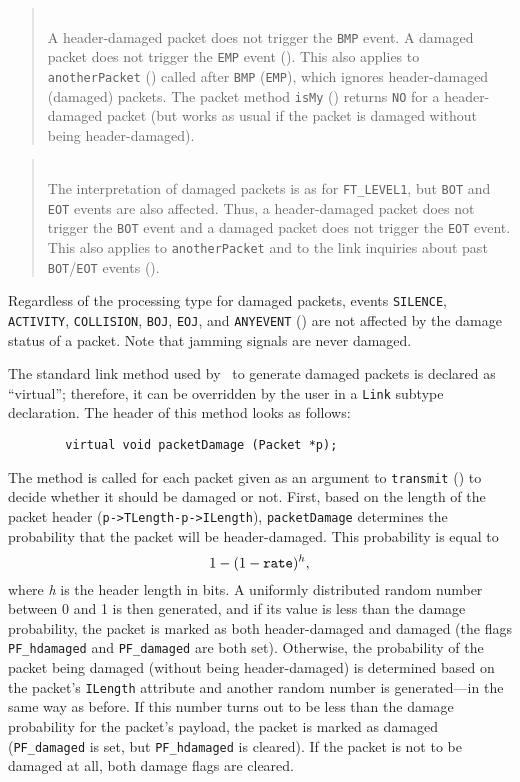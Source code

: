 \begin{quote}
\noindent{}\\ \hspace{0in}
A header-damaged packet does not trigger the {\tt BMP} event.
A damaged packet does not trigger the {\tt EMP} event ().
This also applies to {\tt anotherPacket} ()
called after {\tt BMP} ({\tt EMP}),
which ignores header-damaged (damaged) packets.
The packet method {\tt isMy} () returns {\tt NO} for
a header-damaged packet (but works as usual if the packet is damaged without
being header-damaged).
\end{quote}

\begin{quote}
\noindent{}\\ \hspace{0in}
The interpretation of damaged packets is as for {\tt FT\_LEVEL1}, but
{\tt BOT} and {\tt EOT} events are also affected.
Thus, a header-damaged packet does not trigger the {\tt BOT} event and
a damaged packet does not trigger the {\tt EOT} event.
This also applies to {\tt anotherPacket} and to the link inquiries about past
{\tt BOT}/{\tt EOT} events ().
\end{quote}\medskip

Regardless of the processing type for damaged packets, events {\tt SILENCE},
{\tt ACTIVITY}, {\tt COLLISION}, {\tt BOJ}, {\tt EOJ}, and {\tt ANYEVENT}
() are not affected by the damage status of a packet.
Note that jamming signals are never damaged.

The standard link
method used by \smurph\ to generate damaged packets is declared
as ``virtual''; therefore, it can be overridden by the user in a {\tt Link}
subtype declaration.
The header of this method looks as follows:
\begin{verbatim}
        virtual void packetDamage (Packet *p);
\end{verbatim}
The method is called for each packet given as an argument to {\tt transmit}
() to decide whether it should be damaged or not.
First,
based on the length of the packet header ({\tt p->TLength-p->ILength}),
{\tt packetDamage} determines the probability that the packet will
be header-damaged.
This probability is equal to
\[
1-(1-{\tt rate})^{h},
\]
where {\em h\/} is the header length in bits.
A uniformly distributed random number between 0 and 1 is then generated,
and if its value is less than the damage probability, the packet is
marked as both header-damaged and damaged (the flags
{\tt PF\_hdamaged} and {\tt PF\_damaged} are both set).
Otherwise, the probability of the packet being damaged (without being
header-damaged) is determined based on the packet's {\tt ILength} attribute
and another random number is generated---in the same way as before.
If this number turns out to be less than the damage probability for the
packet's payload, the packet is marked as damaged ({\tt PF\_damaged} is set,
but {\tt PF\_hdamaged} is cleared).
If the packet is not to be damaged at all, both damage flags are cleared.

